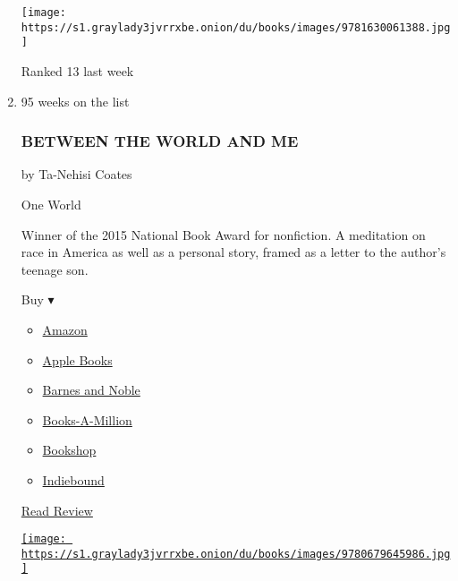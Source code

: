 \begin{enumerate}
  \texttt{[image: https://s1.graylady3jvrrxbe.onion/du/books/images/9781630061388.jpg]}

  Ranked 13 last week
\item
  \href{https://www.nytimes3xbfgragh.onion/2015/08/17/books/review/ta-nehisi-coatess-between-the-world-and-me.html}{}

  95 weeks on the list

  \hypertarget{between-the-world-and-me}{%
  \subsubsection{BETWEEN THE WORLD AND
  ME}\label{between-the-world-and-me}}

  by Ta-Nehisi Coates

  One World

  Winner of the 2015 National Book Award for nonfiction. A meditation on
  race in America as well as a personal story, framed as a letter to the
  author's teenage son.

  Buy ▾

  \begin{itemize}
  \tightlist
  \item
    \href{http://www.amazon.com/Between-World-Me-Ta-Nehisi-Coates-ebook/dp/B00SEFAIRI?tag=NYTBS-20}{Amazon}
  \item
    \href{https://du-gae-books-dot-nyt-du-prd.appspot.com/buy?title=BETWEEN+THE+WORLD+AND+ME\&author=Ta-Nehisi+Coates}{Apple
    Books}
  \item
    \href{https://www.anrdoezrs.net/click-7990613-11819508?url=https\%3A\%2F\%2Fwww.barnesandnoble.com\%2Fw\%2F\%3Fean\%3D9780812993547}{Barnes
    and Noble}
  \item
    \href{https://www.anrdoezrs.net/click-7990613-35140?url=https\%3A\%2F\%2Fwww.booksamillion.com\%2Fp\%2FBETWEEN\%2BTHE\%2BWORLD\%2BAND\%2BME\%2FTa-Nehisi\%2BCoates\%2F9780812993547}{Books-A-Million}
  \item
    \href{https://bookshop.org/a/3546/9780812993547}{Bookshop}
  \item
    \href{https://www.indiebound.org/book/9780812993547?aff=NYT}{Indiebound}
  \end{itemize}

  \href{https://www.nytimes3xbfgragh.onion/2015/08/17/books/review/ta-nehisi-coatess-between-the-world-and-me.html}{Read
  Review}

  \href{https://www.nytimes3xbfgragh.onion/2015/08/17/books/review/ta-nehisi-coatess-between-the-world-and-me.html}{\texttt{[image: https://s1.graylady3jvrrxbe.onion/du/books/images/9780679645986.jpg]}}


\end{enumerate}

